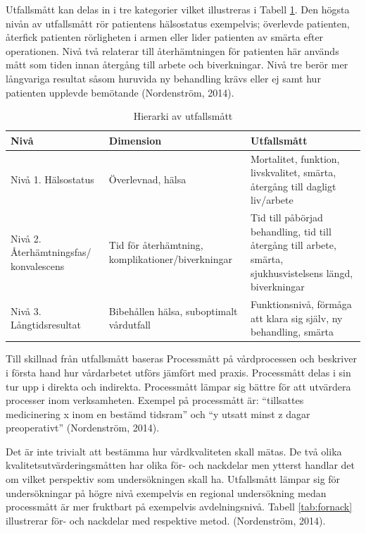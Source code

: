 Utfallsmått kan delas in i tre kategorier vilket illustreras i Tabell \ref{utfallsh}. Den högsta nivån av utfallsmått rör patientens hälsostatus exempelvis; överlevde patienten, återfick patienten rörligheten i armen eller lider patienten av smärta efter operationen. Nivå två relaterar till återhämtningen för patienten här används mått som tiden innan återgång till arbete och biverkningar. Nivå tre berör mer långvariga resultat såsom huruvida ny behandling krävs eller ej samt hur patienten upplevde bemötande  (Nordenström, 2014).

\begin{table}[h]
\centering
\caption{Hierarki av utfallsmått}
\label{utfallsh}
\begin{tabular}{|p{3cm}|p{5cm}|p{5cm}|}
\hline
Nivå & Dimension & Utfallsmått \\ \hline
Nivå 1. \newline Hälsostatus & Överlevnad, hälsa & Mortalitet, funktion, livskvalitet, smärta, återgång till dagligt liv/arbete \\ \hline
Nivå 2. \newline Återhämtningsfas/ konvalescens & Tid för återhämtning, komplikationer/biverkningar & Tid till påbörjad behandling, tid till återgång till arbete, smärta, sjukhusvistelsens längd, biverkningar \\ \hline
Nivå 3. \newline Långtidsresultat & Bibehållen hälsa, suboptimalt vårdutfall & Funktionsnivå, förmåga att klara sig själv, ny behandling, smärta \\ \hline
\end{tabular}
\end{table}

Till skillnad från utfallsmått baseras Processmått  på vårdprocessen och beskriver i första hand hur vårdarbetet utförs jämfört med praxis. Processmått delas i sin tur upp i direkta och indirekta. Processmått lämpar sig bättre för att utvärdera processer inom verksamheten. Exempel på processmått är: “tillsattes medicinering x inom en bestämd tidsram” och “y utsatt minst z dagar preoperativt” (Nordenström, 2014).
 
Det är inte trivialt att bestämma hur vårdkvaliteten skall mätas. De två olika kvalitetsutvärderingsmåtten har olika för- och nackdelar men ytterst handlar det om vilket perspektiv som undersökningen skall ha. Utfallsmått lämpar sig för undersökningar på högre nivå exempelvis en regional undersökning medan processmått är mer fruktbart på exempelvis avdelningsnivå. Tabell \ref{tab:fornack} illustrerar för- och nackdelar med respektive metod. (Nordenström, 2014).

